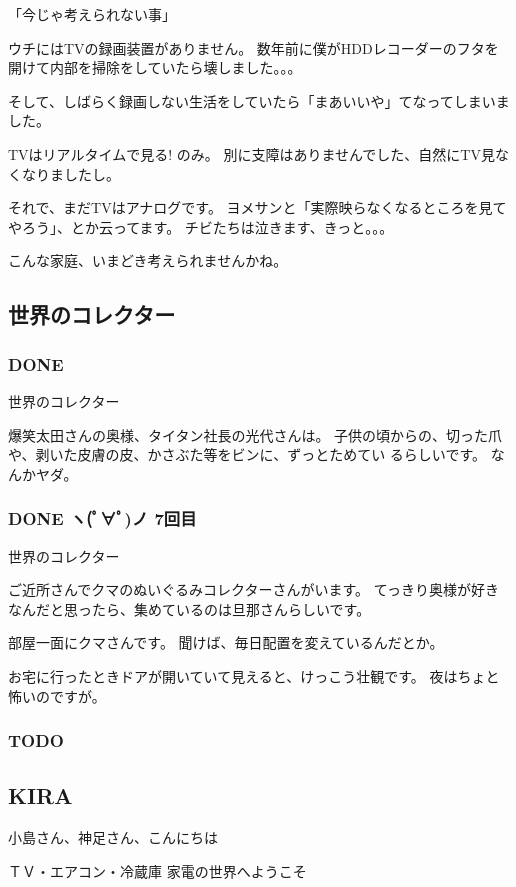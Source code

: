 \documentclass[11pt]{article}
\begin{document}
「今じゃ考えられない事」

ウチにはTVの録画装置がありません。
数年前に僕がHDDレコーダーのフタを開けて内部を掃除をしていたら壊しました。。。

そして、しばらく録画しない生活をしていたら「まあいいや」てなってしまいました。

TVはリアルタイムで見る! のみ。
別に支障はありませんでした、自然にTV見なくなりましたし。

それで、まだTVはアナログです。
ヨメサンと「実際映らなくなるところを見てやろう」、とか云ってます。
チビたちは泣きます、きっと。。。

こんな家庭、いまどき考えられませんかね。
\subsection{世界のコレクター}
\label{sec-106_2}
\subsubsection{\textbf{DONE}}
\label{sec-106_2_1}

世界のコレクター

爆笑太田さんの奥様、タイタン社長の光代さんは。
子供の頃からの、切った爪や、剥いた皮膚の皮、かさぶた等をビンに、ずっとためてい
るらしいです。
なんかヤダ。
\subsubsection{\textbf{DONE} ヽ(ﾟ∀ﾟ)ノ 7回目}
\label{sec-106_2_2}

世界のコレクター

ご近所さんでクマのぬいぐるみコレクターさんがいます。
てっきり奥様が好きなんだと思ったら、集めているのは旦那さんらしいです。

部屋一面にクマさんです。
聞けば、毎日配置を変えているんだとか。

お宅に行ったときドアが開いていて見えると、けっこう壮観です。
夜はちょと怖いのですが。
\subsubsection{\textbf{TODO}}
\label{sec-106_2_3}
\subsection{KIRA}
\label{sec-106_3}

小島さん、神足さん、こんにちは

ＴＶ・エアコン・冷蔵庫 家電の世界へようこそ
\end{document}

